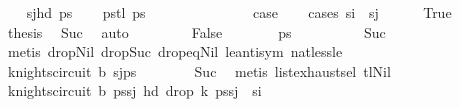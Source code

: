 \begin{isabellebody}
\ \ \isamarkupfalse%
\ {\isacharquery}{\kern0pt}s\isactrlsub j{\isacharequal}{\kern0pt}{\isachardoublequoteopen}hd\ ps{\isachardoublequoteclose}\isanewline
\ \ \isamarkupfalse%
\ {\isacharquery}{\kern0pt}ps{\isacharprime}{\kern0pt}{\isacharequal}{\kern0pt}{\isachardoublequoteopen}tl\ ps{\isachardoublequoteclose}\ \ \ \ \ \ \ \ \ \ \ \isanewline
\ \ \isamarkupfalse%
\ {\isacharquery}{\kern0pt}case\isanewline
\ \ \isamarkupfalse%
\ {\isacharparenleft}{\kern0pt}cases\ {\isachardoublequoteopen}s\isactrlsub i\ {\isacharequal}{\kern0pt}\ {\isacharquery}{\kern0pt}s\isactrlsub j{\isachardoublequoteclose}{\isacharparenright}{\kern0pt}\isanewline
\ \ \ \ \isamarkupfalse%
\ True\isanewline
\ \ \ \ \isamarkupfalse%
\ \isamarkupfalse%
\ {\isacharquery}{\kern0pt}thesis\ \isamarkupfalse%
\ Suc\ \isamarkupfalse%
\ auto\isanewline
\ \ \isamarkupfalse%
\isanewline
\ \ \ \ \isamarkupfalse%
\ False\isanewline
\ \ \ \ \isamarkupfalse%
\ \isamarkupfalse%
\ {\isachardoublequoteopen}{\isacharquery}{\kern0pt}ps{\isacharprime}{\kern0pt}\ {\isasymnoteq}\ {\isacharbrackleft}{\kern0pt}{\isacharbrackright}{\kern0pt}{\isachardoublequoteclose}\isanewline
\ \ \ \ \ \ \isamarkupfalse%
\ Suc\ \isamarkupfalse%
\ {\isacharparenleft}{\kern0pt}metis\ drop{\isacharunderscore}{\kern0pt}Nil\ drop{\isacharunderscore}{\kern0pt}Suc\ drop{\isacharunderscore}{\kern0pt}eq{\isacharunderscore}{\kern0pt}Nil{}\ le{\isacharunderscore}{\kern0pt}antisym\ nat{\isacharunderscore}{\kern0pt}less{\isacharunderscore}{\kern0pt}le{\isacharparenright}{\kern0pt}\isanewline
\ \ \ \ \isamarkupfalse%
\ \isamarkupfalse%
\ {\isachardoublequoteopen}knights{\isacharunderscore}{\kern0pt}circuit\ b\ {\isacharparenleft}{\kern0pt}{\isacharquery}{\kern0pt}s\isactrlsub j{\isacharhash}{\kern0pt}{\isacharquery}{\kern0pt}ps{\isacharprime}{\kern0pt}{\isacharparenright}{\kern0pt}{\isachardoublequoteclose}\isanewline
\ \ \ \ \ \ \isamarkupfalse%
\ Suc\ \isamarkupfalse%
\ {\isacharparenleft}{\kern0pt}metis\ list{\isachardot}{\kern0pt}exhaust{\isacharunderscore}{\kern0pt}sel\ tl{\isacharunderscore}{\kern0pt}Nil{\isacharparenright}{\kern0pt}\isanewline
\ \ \ \ \isamarkupfalse%
\ \isamarkupfalse%
\ {\isachardoublequoteopen}knights{\isacharunderscore}{\kern0pt}circuit\ b\ {\isacharparenleft}{\kern0pt}{\isacharquery}{\kern0pt}ps{\isacharprime}{\kern0pt}{\isacharat}{\kern0pt}{\isacharbrackleft}{\kern0pt}{\isacharquery}{\kern0pt}s\isactrlsub j{\isacharbrackright}{\kern0pt}{\isacharparenright}{\kern0pt}{\isachardoublequoteclose}\ {\isachardoublequoteopen}hd\ {\isacharparenleft}{\kern0pt}drop\ k\ {\isacharparenleft}{\kern0pt}{\isacharquery}{\kern0pt}ps{\isacharprime}{\kern0pt}{\isacharat}{\kern0pt}{\isacharbrackleft}{\kern0pt}{\isacharquery}{\kern0pt}s\isactrlsub j{\isacharbrackright}{\kern0pt}{\isacharparenright}{\kern0pt}{\isacharparenright}{\kern0pt}\ {\isacharequal}{\kern0pt}\ s\isactrlsub i{\isachardoublequoteclose}\ \isanewline

\end{isabellebody}
